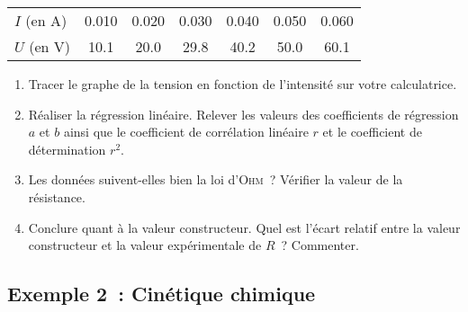 \documentclass[../main/main.tex]{subfiles}
\begin{document}
\begin{center}
	\begin{tabular}{ l  c  c  c  c  c  c }
		\toprule
		$I$ (en A)  & \num{0,010} & \num{0,020} & \num{0,030} & \num{0,040} &
		\num{0,050} & \num{0,060}                                             \\

		$U$ (en V)  & \num{10,1}  & \num{20,0}  & \num{29,8}  & \num{40,2}  &
		\num{50,0}  & \num{60,1}                                              \\

		\bottomrule
	\end{tabular}
\end{center}

\begin{enumerate}
	\item Tracer le graphe de la tension en fonction de l'intensité sur votre
	      calculatrice.
	\item Réaliser la régression linéaire. Relever les valeurs des coefficients de
	      régression $a$ et $b$ ainsi que le coefficient de corrélation linéaire
	      $r$ et le coefficient de détermination $r^2$.
	\item Les données suivent-elles bien la loi d'\textsc{Ohm}~? Vérifier la
	      valeur de la résistance.
	      \bigbreak
	\item Conclure quant à la valeur constructeur. Quel est l'écart relatif entre
	      la valeur constructeur et la valeur expérimentale de $R$~? Commenter.
	      \bigbreak
\end{enumerate}

\subsection{Exemple 2~: Cinétique chimique}
\end{document}

